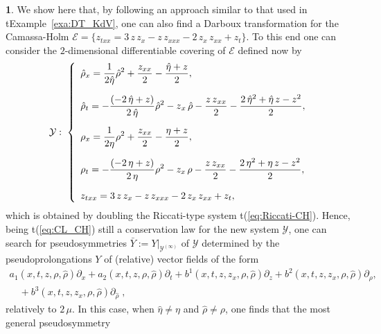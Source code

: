 \documentclass[12pt,english]{elsarticle}
\theoremstyle{plain}
\theoremstyle{plain}
\theoremstyle{remark}
\theoremstyle{plain}
\theoremstyle{definition}
\theoremstyle{definition}
\newtheorem{example}[thm]{\protect\examplename}
\providecommand{\examplename}{Example}
\begin{document}
\begin{example}
\label{exmp32}
We show here that, by following an approach similar to that used in t{Example~\ref{exa:DT_KdV}}, one can also find a Darboux transformation for the Camassa-Holm
$\mathcal{E}=\{z_{txx}=3\,z\,z_{x}-z\,z_{xxx}-2\,z_{x}\,z_{xx}+z_{t}
\}$. To this end one can consider the $2$-dimensional differentiable covering
of $\mathcal{E}$ defined now by
%
\begin{equation*}
\mathcal{Y}:\;\left \{ {\displaystyle
%
\begin{array}{l}
{\displaystyle \hat{\rho}{}_{x}=\frac{1}{2\hat{\eta}}\hat{\rho}^{2}+
\frac{z_{xx}}{2}-
\frac{{\hat{\eta}}+z}{2}},
\vspace{10pt}
\\
{\displaystyle \hat{\rho}{}_{t}=-
\frac{\left (-2\,\hat{\eta}+z\right )}{2\,\hat{\eta}}\hat{\rho}^{2}-z{}_{x}
\,\hat{\rho}-\frac{z\,z{}_{xx}}{2}-
\frac{2\,\hat{\eta}^{2}+\hat{\eta}\,z-z{}^{2}}{2}},
\vspace{10pt}
\\
{\displaystyle \rho _{x}=\frac{1}{2\eta}\rho ^{2}+\frac{z_{xx}}{2}-
\frac{{\eta}+z}{2}},
\vspace{10pt}
\\
{\displaystyle \rho _{t}=-\frac{\left (-2\,\eta +z\right )}{2\,\eta}
\rho ^{2}-z_{x}\,\rho -\frac{z\,z_{xx}}{2}-
\frac{2\,\eta ^{2}+\eta\,z-z^{2}}{2}},
\vspace{10pt}
\\
z_{txx}=3\,z\,z_{x}-z\,z_{xxx}-2\,z_{x}\,z_{xx}+z_{t},
\end{array}
%
}\right .
\end{equation*}
%
which is obtained by doubling the Riccati-type system t{(\ref{eq:Riccati-CH})}.
Hence, being t{(\ref{eq:CL_CH})} still a conservation law for the new system
$\mathcal{Y}$, one can search for pseudosymmetries
$\bar{Y}:=\left .Y\right |_{\mathcal{Y}^{(\infty )}}$ of
$\mathcal{Y}$ determined by the pseudoprolongations $Y$ of (relative) vector
fields of the form
\begin{eqnarray*}[ll]
a_{1}(x,t,z,\rho ,\hat{\rho})\partial _{x}+a_{2}(x,t,z,\rho ,
\hat{\rho})\partial _{t}+b^{1}(x,t,z,z_{x},\rho ,\hat{\rho})\partial _{z}+b^{2}(x,t,z,z_{x},
\rho ,\hat{\rho})\partial _{\rho},\\
\quad{}+b^{3}(x,t,z,z_{x},\rho ,\hat{\rho})
\partial _{\hat{\rho}}\;,
\end{eqnarray*}
%
relatively to $2\,\mu $. In this case, when $\hat{\eta}\neq \eta $ and
$\hat{\rho}\neq \rho $, one finds that the most general pseudosymmetry

\end{example}
\end{document}
